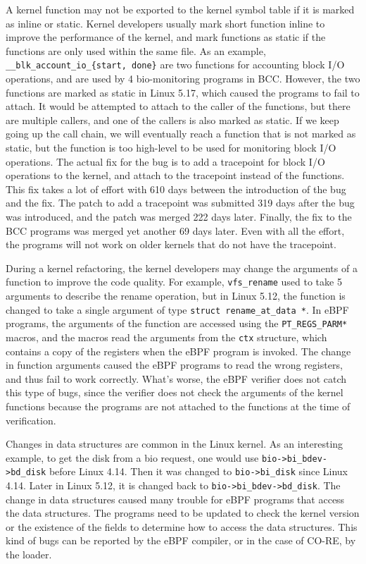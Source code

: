 A kernel function may not be exported to the kernel symbol table if it is marked as inline or static.
Kernel developers usually mark short function inline to improve the performance of the kernel, and mark functions as static if the functions are only used within the same file.
As an example, \texttt{\_\_blk\_account\_io\_\{start, done\}} are two functions for accounting block I/O operations, and are used by 4 bio-monitoring programs in BCC. However, the two functions are marked as static in Linux 5.17, which caused the programs to fail to attach.
It would be attempted to attach to the caller of the functions, but there are multiple callers, and one of the callers is also marked as static.
If we keep going up the call chain, we will eventually reach a function that is not marked as static, but the function is too high-level to be used for monitoring block I/O operations.
The actual fix for the bug is to add a tracepoint for block I/O operations to the kernel, and attach to the tracepoint instead of the functions.
This fix takes a lot of effort with 610 days between the introduction of the bug and the fix.
The patch to add a tracepoint was submitted 319 days after the bug was introduced, and the patch was merged 222 days later. Finally, the fix to the BCC programs was merged yet another 69 days later.
Even with all the effort, the programs will not work on older kernels that do not have the tracepoint.

During a kernel refactoring, the kernel developers may change the arguments of a function to improve the code quality.
For example, \texttt{vfs\_rename} used to take 5 arguments to describe the rename operation, but in Linux 5.12, the function is changed to take a single argument of type \texttt{struct rename\_at\_data *}.
In eBPF programs, the arguments of the function are accessed using the \texttt{PT\_REGS\_PARM*} macros, and the macros read the arguments from the \texttt{ctx} structure, which contains a copy of the registers when the eBPF program is invoked.
The change in function arguments caused the eBPF programs to read the wrong registers, and thus fail to work correctly.
What's worse, the eBPF verifier does not catch this type of bugs, since the verifier does not check the arguments of the kernel functions because the programs are not attached to the functions at the time of verification.

Changes in data structures are common in the Linux kernel.
As an interesting example, to get the disk from a bio request, one would use \texttt{bio->bi\_bdev->bd\_disk} before Linux 4.14. Then it was changed to \texttt{bio->bi\_disk} since Linux 4.14. Later in Linux 5.12, it is changed back to \texttt{bio->bi\_bdev->bd\_disk}.
The change in data structures caused many trouble for eBPF programs that access the data structures.
The programs need to be updated to check the kernel version or the existence of the fields to determine how to access the data structures.
This kind of bugs can be reported by the eBPF compiler, or in the case of CO-RE, by the loader. 

